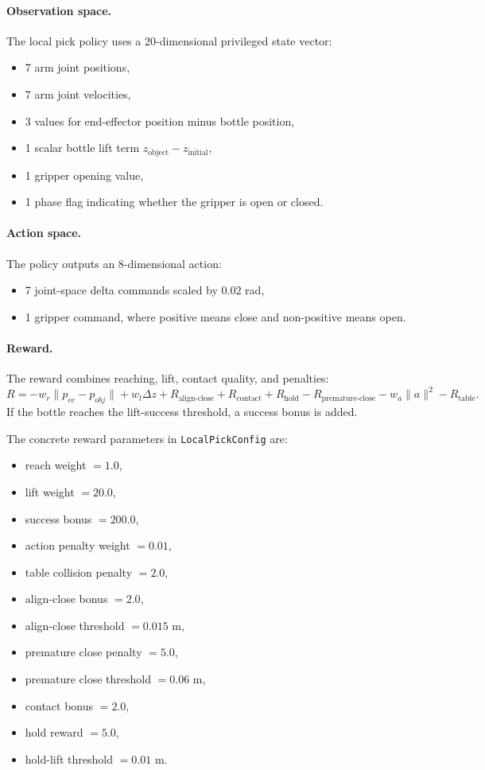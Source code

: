 \documentclass[11pt]{article}
\begin{document}
\paragraph{Observation space.}
The local pick policy uses a 20-dimensional privileged state vector:
\begin{itemize}[leftmargin=*]
    \item 7 arm joint positions,
    \item 7 arm joint velocities,
    \item 3 values for end-effector position minus bottle position,
    \item 1 scalar bottle lift term \(z_{\text{object}} - z_{\text{initial}}\),
    \item 1 gripper opening value,
    \item 1 phase flag indicating whether the gripper is open or closed.
\end{itemize}

\paragraph{Action space.}
The policy outputs an 8-dimensional action:
\begin{itemize}[leftmargin=*]
    \item 7 joint-space delta commands scaled by \(0.02\) rad,
    \item 1 gripper command, where positive means close and non-positive means open.
\end{itemize}

\paragraph{Reward.}
The reward combines reaching, lift, contact quality, and penalties:
\[
R =
- w_r \|p_{ee}-p_{obj}\|
+ w_l \Delta z
+ R_{\text{align-close}}
+ R_{\text{contact}}
+ R_{\text{hold}}
- R_{\text{premature-close}}
- w_a \|a\|^2
- R_{\text{table}}.
\]
If the bottle reaches the lift-success threshold, a success bonus is added.

The concrete reward parameters in \texttt{LocalPickConfig} are:
\begin{itemize}[leftmargin=*]
    \item reach weight \(= 1.0\),
    \item lift weight \(= 20.0\),
    \item success bonus \(= 200.0\),
    \item action penalty weight \(= 0.01\),
    \item table collision penalty \(= 2.0\),
    \item align-close bonus \(= 2.0\),
    \item align-close threshold \(= 0.015\) m,
    \item premature close penalty \(= 5.0\),
    \item premature close threshold \(= 0.06\) m,
    \item contact bonus \(= 2.0\),
    \item hold reward \(= 5.0\),
    \item hold-lift threshold \(= 0.01\) m.
\end{itemize}
\end{document}
